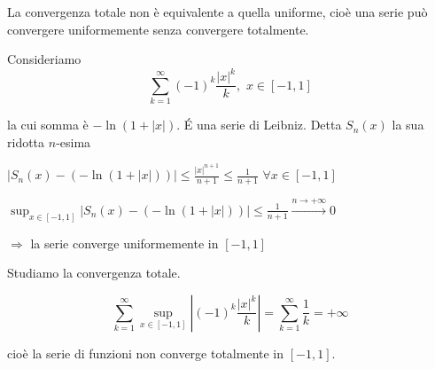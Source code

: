 \begin{exbar}
\begin{example}
	La convergenza totale non è equivalente a quella uniforme, cioè una serie può convergere uniformemente senza convergere totalmente.
	
	Consideriamo 
	\begin{equation*}
		\sum_{k=1}^{\infty}(-1)^k \frac{|x|^k}{k},\,\, x \in [-1,1]    
	\end{equation*}
	
	la cui somma è $-\ln (1+|x|)$. \'E una serie di Leibniz. Detta $S_n(x)$ la sua ridotta $n$-esima
	\begin{center} 
		$|S_n(x)-(-\ln (1+|x|))|\leq \frac{|x|^{n+1}}{n+1}\leq \frac{1}{n+1}\,\, \forall x \in [-1,1]$
		
		$\sup_{x \in [-1,1]}|S_n(x)-(-\ln (1+|x|))| \leq \frac{1}{n+1}\xrightarrow{n \rightarrow +\infty} 0$
		
		$\Rightarrow$ la serie converge uniformemente in $[-1,1]$
	\end{center} 
	
	Studiamo la convergenza totale. 
	
	$$\sum_{k=1}^{\infty}\sup_{x \in [-1,1]}|(-1)^k\frac{|x|^k}{k}|= \sum_{k=1}^{\infty} \frac{1}{k}=+\infty$$
	
	cioè la serie di funzioni non converge totalmente in $[-1,1]$. 
\end{example}
\end{exbar}


